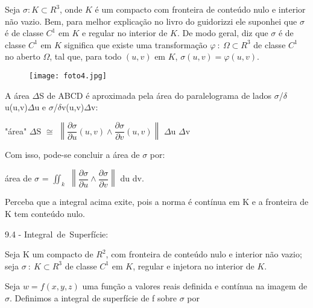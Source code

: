 \documentclass[11pt,a4paper]{article}
\begin{document}
	Seja $\sigma: K \subset R^3$, onde $K$ é um compacto com fronteira de conteúdo nulo e interior não vazio. Bem, para melhor explicação no livro do guidorizzi ele suponhei que $\sigma$ é de classe $C^1$ em $K$ e regular no interior de $K$. De modo geral, diz que $\sigma$ é de classe $C^1$ em $K$ significa que existe uma transformação $\varphi\ :\ \Omega \subset R^3$ de classe $C^1$ no aberto $\Omega$, tal que, para todo $(u,v)$ em $K$, $\sigma(u,v) = \varphi(u,v)$.\\
	
	\begin{figure}[h]	
	\centering %
	\texttt{[image: foto4.jpg]} 
	\end{figure}	
	
	A área $\Delta$S de ABCD é aproximada pela área do paralelograma de lados $\sigma$/$\delta$u(u,v)$\Delta$u e $\sigma$/$\delta$v(u,v)$\Delta$v:\\
	
	\begin{center}
		"área" $\Delta$S $\cong$ $\left \| \dfrac{\partial\sigma}{\partial u}(u,v) \wedge \dfrac{\partial\sigma}{\partial v}(u,v) \right \|$ $\Delta$u $\Delta$v
	\end{center}
	\newpage
	
	Com isso, pode-se concluir a área de $\sigma$ por:
	
	\begin{center}
		área de $\sigma$ = $\iint_{k}^{}$ $\left \| \dfrac{\partial\sigma}{\partial u} \wedge \dfrac{\partial\sigma}{\partial v} \right \|$ du dv.\\
	\end{center}
	
	Perceba que a integral acima exite, pois a norma é contínua em K e a fronteira de K tem conteúdo nulo.\\
	
	\begin{large}
		9.4 - Integral\ de\ Superfície:
	\end{large}
	
	Seja K um compacto de $R^2$, com fronteira de conteúdo nulo e interior não vazio; seja $\sigma\ :\ K \subset R^3$ de classe $C^1$ em $K$, regular e injetora no interior de $K$.
	
	Seja $w = f(x,y,z)$ uma função a valores reais definida e contínua na imagem de $\sigma$. Definimos a integral de superfície de f sobre $\sigma$ por\\ 
    
\end{document}

